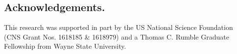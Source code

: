 \subsection*{Acknowledgements.}
This research was supported in part by the US National Science Foundation (CNS Grant Nos. 1618185 \& 1618979) and a Thomas C. Rumble Graduate Fellowship from Wayne State University.







